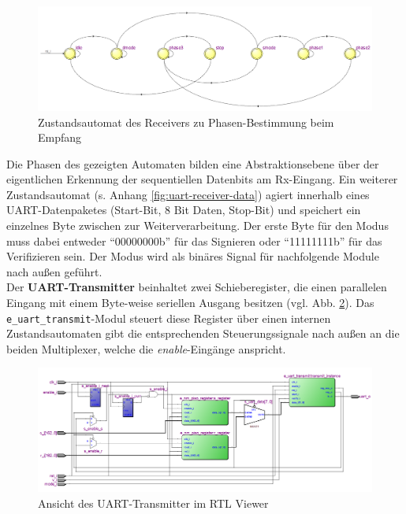 \begin{figure}[thb]
	\centering
  	\includegraphics[width=\textwidth]{bilder/uart-receiver-phase}
	\caption{Zustandsautomat des Receivers zu Phasen-Bestimmung beim Empfang}
	\label{fig:uart-receiver-phase}
\end{figure}

Die Phasen des gezeigten Automaten bilden eine Abstraktionsebene über der eigentlichen Erkennung der sequentiellen Datenbits am Rx-Eingang. Ein weiterer Zustandsautomat (s. Anhang \ref{fig:uart-receiver-data}) agiert innerhalb eines UART-Datenpaketes (Start-Bit, 8 Bit Daten, Stop-Bit) und speichert ein einzelnes Byte zwischen zur Weiterverarbeitung. Der erste Byte für den Modus muss dabei entweder ``00000000b'' für das Signieren oder ``11111111b'' für das Verifizieren sein. Der Modus wird als binäres Signal für nachfolgende Module nach außen geführt. \\

Der \textbf{UART-Transmitter} beinhaltet zwei Schieberegister, die einen parallelen Eingang mit einem Byte-weise seriellen Ausgang besitzen (vgl. Abb. \ref{fig:uarttx}). Das \texttt{e\_uart\_transmit}-Modul steuert diese Register über einen internen Zustandsautomaten gibt die entsprechenden Steuerungssignale nach außen an die beiden Multiplexer, welche die \textit{enable}-Eingänge anspricht. \\

\begin{figure}[H]
	\centering
  	\includegraphics[width=\textwidth]{bilder/uart-transmitter}
	\caption{Ansicht des UART-Transmitter im RTL Viewer}
	\label{fig:uarttx}
\end{figure}

